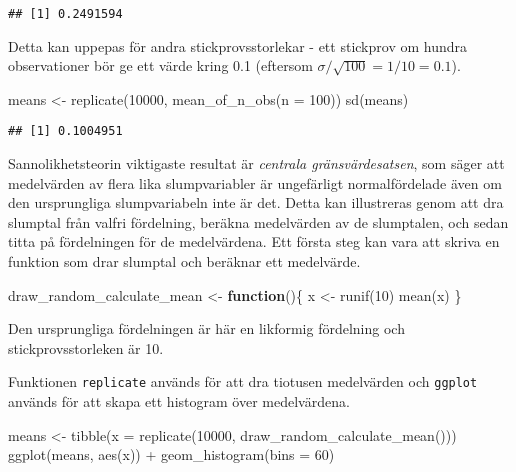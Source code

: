 \documentclass[
]{book}
\newenvironment{Shaded}{\begin{snugshade}}{\end{snugshade}}
\newcommand{\AttributeTok}[1]{\textcolor[rgb]{0.77,0.63,0.00}{#1}}
\newcommand{\ControlFlowTok}[1]{\textcolor[rgb]{0.13,0.29,0.53}{\textbf{#1}}}
\newcommand{\DecValTok}[1]{\textcolor[rgb]{0.00,0.00,0.81}{#1}}
\newcommand{\FunctionTok}[1]{\textcolor[rgb]{0.00,0.00,0.00}{#1}}
\newcommand{\NormalTok}[1]{#1}
\newcommand{\OtherTok}[1]{\textcolor[rgb]{0.56,0.35,0.01}{#1}}
\newcommand{\SpecialCharTok}[1]{\textcolor[rgb]{0.00,0.00,0.00}{#1}}
\theoremstyle{definition}
\theoremstyle{definition}
\theoremstyle{definition}
\theoremstyle{definition}
\theoremstyle{remark}
\begin{document}
\begin{verbatim}
## [1] 0.2491594
\end{verbatim}

Detta kan uppepas för andra stickprovsstorlekar - ett stickprov om hundra observationer bör ge ett värde kring 0.1 (eftersom \(\sigma / \sqrt{100} = 1 / 10 = 0.1\)).

\begin{Shaded}
\begin{Highlighting}[]
\NormalTok{means }\OtherTok{\textless{}{-}} \FunctionTok{replicate}\NormalTok{(}\DecValTok{10000}\NormalTok{, }\FunctionTok{mean\_of\_n\_obs}\NormalTok{(}\AttributeTok{n =} \DecValTok{100}\NormalTok{))}
\FunctionTok{sd}\NormalTok{(means)}
\end{Highlighting}
\end{Shaded}

\begin{verbatim}
## [1] 0.1004951
\end{verbatim}

Sannolikhetsteorin viktigaste resultat är \emph{centrala gränsvärdesatsen}, som säger att medelvärden av flera lika slumpvariabler är ungefärligt normalfördelade även om den ursprungliga slumpvariabeln inte är det. Detta kan illustreras genom att dra slumptal från valfri fördelning, beräkna medelvärden av de slumptalen, och sedan titta på fördelningen för de medelvärdena. Ett första steg kan vara att skriva en funktion som drar slumptal och beräknar ett medelvärde.

\begin{Shaded}
\begin{Highlighting}[]
\NormalTok{draw\_random\_calculate\_mean }\OtherTok{\textless{}{-}} \ControlFlowTok{function}\NormalTok{()\{}
\NormalTok{  x }\OtherTok{\textless{}{-}} \FunctionTok{runif}\NormalTok{(}\DecValTok{10}\NormalTok{)}
  \FunctionTok{mean}\NormalTok{(x)}
\NormalTok{\}}
\end{Highlighting}
\end{Shaded}

Den ursprungliga fördelningen är här en likformig fördelning och stickprovsstorleken är 10.

Funktionen \texttt{replicate} används för att dra tiotusen medelvärden och \texttt{ggplot} används för att skapa ett histogram över medelvärdena.

\begin{Shaded}
\begin{Highlighting}[]
\NormalTok{means }\OtherTok{\textless{}{-}} \FunctionTok{tibble}\NormalTok{(}\AttributeTok{x =} \FunctionTok{replicate}\NormalTok{(}\DecValTok{10000}\NormalTok{, }\FunctionTok{draw\_random\_calculate\_mean}\NormalTok{()))}
\FunctionTok{ggplot}\NormalTok{(means, }\FunctionTok{aes}\NormalTok{(x)) }\SpecialCharTok{+}
  \FunctionTok{geom\_histogram}\NormalTok{(}\AttributeTok{bins =} \DecValTok{60}\NormalTok{)}
\end{Highlighting}
\end{Shaded}
\end{document}

